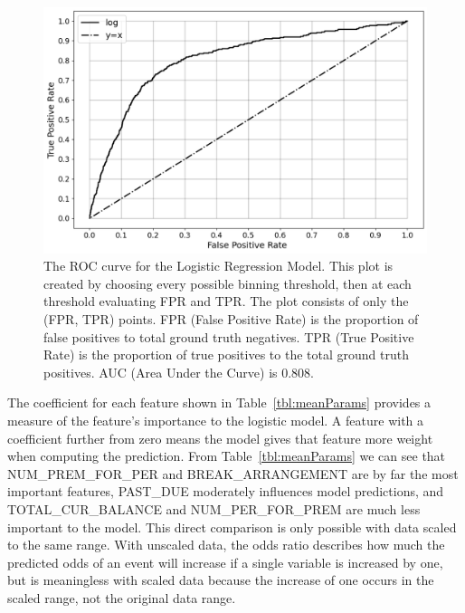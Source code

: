 \documentclass[10pt,letterpaper]{article}
\begin{document}
\begin{figure}[htb]
    \centering
    \includegraphics[width=\textwidth]{ROC.png}
    \caption[ROC curve]{The ROC curve for the Logistic Regression Model. This plot is created by choosing every possible binning threshold, then at each threshold evaluating FPR and TPR. The plot consists of only the (FPR, TPR) points. FPR (False Positive Rate) is the proportion of false positives to total ground truth negatives. TPR (True Positive Rate) is the proportion of true positives to the total ground truth positives. AUC (Area Under the Curve) is 0.808.}
    \label{fig:ROC}
\end{figure}

The coefficient for each feature shown in Table~\ref{tbl:meanParams} provides a measure of the feature's importance to the logistic model. A feature with a coefficient further from zero means the model gives that feature more weight when computing the prediction. From Table~\ref{tbl:meanParams} we can see that NUM\_PREM\_FOR\_PER and BREAK\_ARRANGEMENT are by far the most important features, PAST\_DUE moderately influences model predictions, and TOTAL\_CUR\_BALANCE and NUM\_PER\_FOR\_PREM are much less important to the model. This direct comparison is only possible with data scaled to the same range. With unscaled data, the odds ratio describes how much the predicted odds of an event will increase if a single variable is increased by one, but is meaningless with scaled data because the increase of one occurs in the scaled range, not the original data range. 
\end{document}
